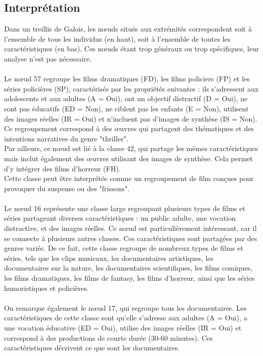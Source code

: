 \documentclass{article}
\begin{document}
\subsection{Interprétation}

Dans un treillis de Galois, les nœuds situés aux extrémités correspondent soit à l’ensemble de tous les individus (en haut), soit à l’ensemble de toutes les caractéristiques (en bas). Ces nœuds étant trop généraux ou trop spécifiques, leur analyse n’est pas nécessaire.
\\
\\
Le nœud 57 regroupe les films dramatiques (FD), les films policiers (FP) et les séries policières (SP), caractérisés par les propriétés suivantes : ils s’adressent aux adolescents et aux adultes (A = Oui), ont un objectif distractif (D = Oui), ne sont pas éducatifs (ED = Non), ne ciblent pas les enfants (E = Non), utilisent des images réelles (IR = Oui) et n’incluent pas d’images de synthèse (IS = Non). Ce regroupement correspond à des œuvres qui partagent des thématiques et des intentions narratives du genre "thriller".
\\
Par ailleurs, ce nœud est lié à la classe 42, qui partage les mêmes caractéristiques mais inclut également des œuvres utilisant des images de synthèse. Cela permet d’y intégrer des films d’horreur (FH).
\\
Cette classe peut être interprétée comme un regroupement de film conçues pour provoquer du suspense ou des "frissons".
\\
\\
Le nœud 16 représente une classe large regroupant plusieurs types de films et séries partageant diverses caractéristiques : un public adulte, une vocation distractive, et des images réelles. Ce nœud est particulièrement intéressant, car il se connecte à plusieurs autres classes. Ces caractéristiques sont partagées par des genres variés. De ce fait, cette classe regroupe de nombreux types de films et séries, tels que les clips musicaux, les documentaires artistiques, les documentaires sur la nature, les documentaires scientifiques, les films comiques, les films dramatiques, les films de fantasy, les films d’horreur, ainsi que les séries humoristiques et policières.
\\
\\
On remarque également le nœud 17, qui regroupe tous les documentaires. Les caractéristiques de cette classe sont qu’elle s’adresse aux adultes (A = Oui), a une vocation éducative (ED = Oui), utilise des images réelles (IR = Oui) et correspond à des productions de courte durée (30-60 minutes). Ces caractéristiques décrivent ce que sont les documentaires.
\\
\end{document}
